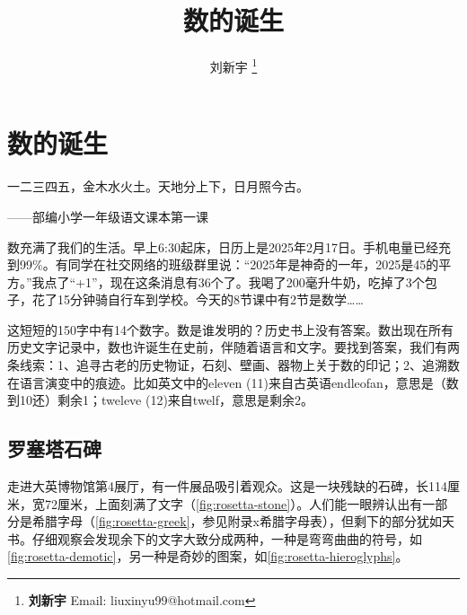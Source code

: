 \documentclass[b5paper]{ctexart}
\begin{document}
\title{数的诞生}

\author{刘新宇
\thanks{{\bfseries 刘新宇} \newline
  Email: liuxinyu99@hotmail.com \newline}
  }

\maketitle
\fi


\ifx\wholebook\relax
\chapter{数的诞生}
\fi

\epigraph{一二三四五，金木水火土。天地分上下，日月照今古。}{——部编小学一年级语文课本第一课}

数充满了我们的生活。早上6:30起床，日历上是2025年2月17日。手机电量已经充到99\%。有同学在社交网络的班级群里说：“2025年是神奇的一年，2025是45的平方。”我点了“+1”，现在这条消息有36个\heartsuit{}了。我喝了200毫升牛奶，吃掉了3个包子，花了15分钟骑自行车到学校。今天的8节课中有2节是数学……

这短短的150字中有14个数字。数是谁发明的？历史书上没有答案。数出现在所有历史文字记录中，数也许诞生在史前，伴随着语言和文字。要找到答案，我们有两条线索：1、追寻古老的历史物证，石刻、壁画、器物上关于数的印记；2、追溯数在语言演变中的痕迹。比如英文中的eleven (11)来自古英语endleofan，意思是（数到10还）剩余1；tweleve (12)来自twelf，意思是剩余2。

\section{罗塞塔石碑}

走进大英博物馆第4展厅，有一件展品吸引着观众。这是一块残缺的石碑，长114厘米，宽72厘米，上面刻满了文字（\cref{fig:rosetta-stone}）。人们能一眼辨认出有一部分是希腊字母（\cref{fig:rosetta-greek}，参见附录x希腊字母表），但剩下的部分犹如天书。仔细观察会发现余下的文字大致分成两种，一种是弯弯曲曲的符号，如\cref{fig:rosetta-demotic}，另一种是奇妙的图案，如\cref{fig:rosetta-hieroglyphs}。
\end{document}

